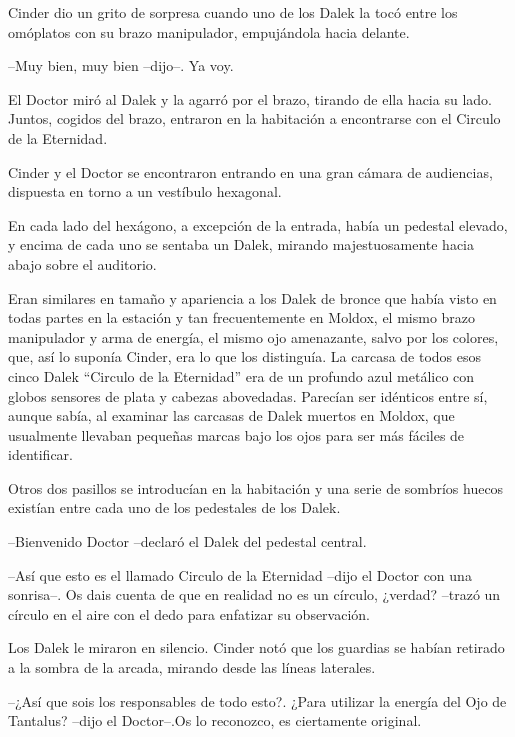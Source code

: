 Cinder dio un grito de sorpresa cuando uno de los Dalek la tocó entre los omóplatos con su brazo manipulador, empujándola hacia delante. 



--Muy bien, muy bien --dijo--. Ya voy.



El Doctor miró al Dalek y la agarró por el brazo, tirando de ella hacia su lado. Juntos, cogidos del brazo, entraron en la habitación a encontrarse con el Circulo de la Eternidad.

Cinder y el Doctor se encontraron entrando en una gran cámara de audiencias, dispuesta en torno a un vestíbulo hexagonal.

En cada lado del hexágono, a excepción de la entrada, había un pedestal elevado, y encima de cada uno se sentaba un Dalek, mirando majestuosamente hacia abajo sobre el auditorio.

Eran similares en tamaño y apariencia a los Dalek de bronce que había visto en todas partes en la estación y tan frecuentemente en Moldox, el mismo brazo manipulador y arma de energía, el mismo ojo amenazante, salvo por los colores, que, así lo suponía Cinder, era lo que los distinguía. La carcasa de todos esos cinco Dalek “Circulo de la Eternidad” era de un profundo azul metálico con globos sensores de plata y cabezas abovedadas. Parecían ser idénticos entre sí, aunque sabía, al examinar las carcasas de Dalek muertos en Moldox, que usualmente llevaban pequeñas marcas bajo los ojos para ser más fáciles de identificar.

Otros dos pasillos se introducían en la habitación y una serie de sombríos huecos existían entre cada uno de los pedestales de los Dalek.



--Bienvenido Doctor --declaró el Dalek del pedestal central.

--Así que esto es el llamado Circulo de la Eternidad --dijo el Doctor con una sonrisa--. Os dais cuenta de que en realidad no es un círculo, ¿verdad? --trazó un círculo en el aire con el dedo para enfatizar su observación.



Los Dalek le miraron en silencio. Cinder notó que los guardias se habían retirado a la sombra de la arcada, mirando desde las líneas laterales.



--¿Así que sois los responsables de todo esto?. ¿Para utilizar la energía del Ojo de Tantalus? --dijo el Doctor--.Os lo reconozco, es ciertamente original.

